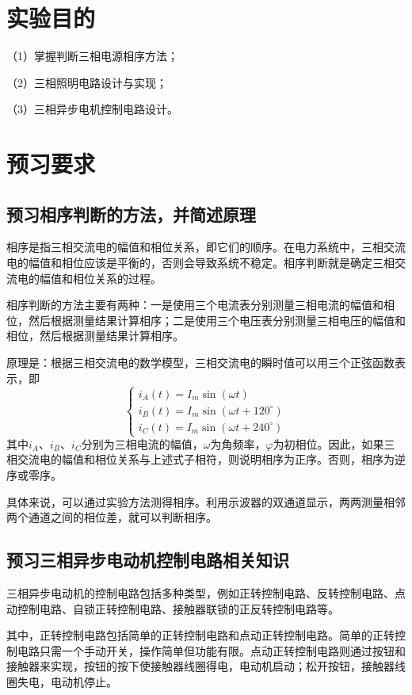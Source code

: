 \documentclass{ctexart}
\begin{document}
\section{实验目的}
（1）掌握判断三相电源相序方法；

（2）三相照明电路设计与实现；

（3）三相异步电机控制电路设计。

\section{预习要求}
\subsection{预习相序判断的方法，并简述原理}
相序是指三相交流电的幅值和相位关系，即它们的顺序。在电力系统中，三相交流电的幅值和相位应该是平衡的，否则会导致系统不稳定。相序判断就是确定三相交流电的幅值和相位关系的过程。

相序判断的方法主要有两种：一是使用三个电流表分别测量三相电流的幅值和相位，然后根据测量结果计算相序；二是使用三个电压表分别测量三相电压的幅值和相位，然后根据测量结果计算相序。

原理是：根据三相交流电的数学模型，三相交流电的瞬时值可以用三个正弦函数表示，即
\begin{equation}
\begin{cases}
    i_A(t)=I_m\sin (\omega t)\\
    i_B(t)=I_m\sin (\omega t + 120 ^{\circ})\\
    i_C(t)=I_m\sin (\omega t + 240 ^{\circ})
\end{cases} 
\end{equation}
其中$i_A$、$i_B$、$i_C$分别为三相电流的幅值，$\omega$为角频率，$\varphi$为初相位。因此，如果三相交流电的幅值和相位关系与上述式子相符，则说明相序为正序。否则，相序为逆序或零序。

具体来说，可以通过实验方法测得相序。利用示波器的双通道显示，两两测量相邻两个通道之间的相位差，就可以判断相序。
\subsection{预习三相异步电动机控制电路相关知识}
三相异步电动机的控制电路包括多种类型，例如正转控制电路、反转控制电路、点动控制电路、自锁正转控制电路、接触器联锁的正反转控制电路等。

其中，正转控制电路包括简单的正转控制电路和点动正转控制电路。简单的正转控制电路只需一个手动开关，操作简单但功能有限。点动正转控制电路则通过按钮和接触器来实现，按钮的按下使接触器线圈得电，电动机启动；松开按钮，接触器线圈失电，电动机停止。
\end{document}
